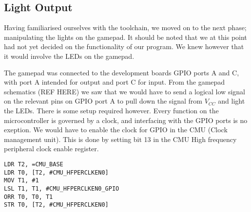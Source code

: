 \subsection{Light Output}
\label{sec:light-output}

Having familiarised ourselves with the toolchain, we moved on to the next phase; manipulating the lights on the gamepad. It should be noted that we at this point had not yet decided on the functionality of our program. We knew however that it would involve the LEDs on the gamepad.

The gamepad was connected to the development boards GPIO ports A and C, with port A intended for output and port C for input. From the gamepad schematics (REF HERE) we saw that we would have to send a logical low signal on the relevant pins on GPIO port A to pull down the signal from $V_{CC}$ and light the LEDs. There is some setup required however. Every function on the microcontroller is governed by a clock, and interfacing with the GPIO ports is no exeption. We would have to enable the clock for GPIO in the CMU (Clock management unit). This is done by setting bit 13 in the CMU High frequency peripheral clock enable register.

\begin{lstlisting}[label=enable-gpio-clock,caption=Enabling GPIO clock in the CMU]
LDR T2, =CMU_BASE
LDR T0, [T2, #CMU_HFPERCLKEN0]
MOV T1, #1
LSL T1, T1, #CMU_HFPERCLKEN0_GPIO
ORR T0, T0, T1
STR T0, [T2, #CMU_HFPERCLKEN0]
\end{lstlisting}
